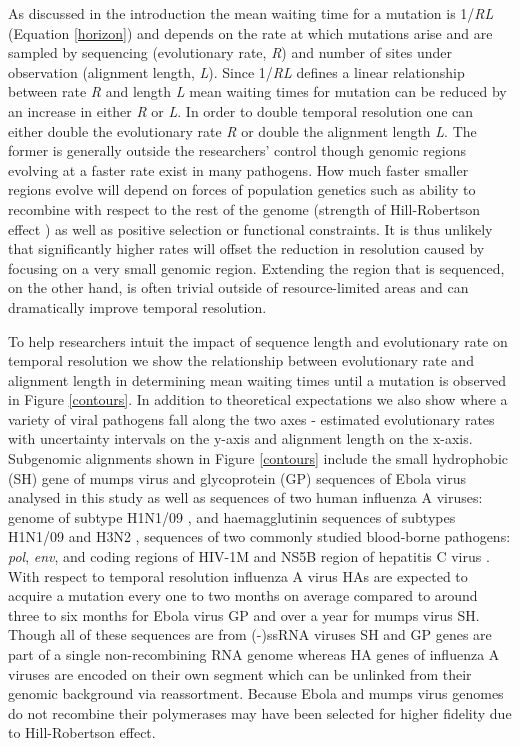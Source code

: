 \documentclass{bmcart}
\begin{document}
As discussed in the introduction the mean waiting time for a mutation is 1/\textit{RL} (Equation \ref{horizon}) and depends on the rate at which mutations arise and are sampled by sequencing (evolutionary rate, \textit{R}) and number of sites under observation (alignment length, \textit{L}).
Since 1/\textit{RL} defines a linear relationship between rate \textit{R} and length \textit{L} mean waiting times for mutation can be reduced by an increase in either \textit{R} or \textit{L}.
In order to double temporal resolution one can either double the evolutionary rate \textit{R} or double the alignment length \textit{L}.
The former is generally outside the researchers' control though genomic regions evolving at a faster rate exist in many pathogens.
How much faster smaller regions evolve will depend on forces of population genetics such as ability to recombine with respect to the rest of the genome (strength of Hill-Robertson effect \cite{hill_effect_1966}) as well as positive selection or functional constraints.
It is thus unlikely that significantly higher rates will offset the reduction in resolution caused by focusing on a very small genomic region.
Extending the region that is sequenced, on the other hand, is often trivial outside of resource-limited areas and can dramatically improve temporal resolution.

To help researchers intuit the impact of sequence length and evolutionary rate on temporal resolution we show the relationship between evolutionary rate and alignment length in determining mean waiting times until a mutation is observed in Figure \ref{contours}.
In addition to theoretical expectations we also show where a variety of viral pathogens fall along the two axes - estimated evolutionary rates with uncertainty intervals on the y-axis and alignment length on the x-axis.
Subgenomic alignments shown in Figure \ref{contours} include the small hydrophobic (SH) gene of mumps virus \cite{cui_evolutionary_2017} and glycoprotein (GP) sequences of Ebola virus analysed in this study as well as sequences of two human influenza A viruses: genome of subtype H1N1/09 \cite{hedge_real-time_2013}, and haemagglutinin sequences of subtypes H1N1/09 \cite{smith_origins_2009} and H3N2 \cite{rambaut_genomic_2008}, sequences of two commonly studied blood-borne pathogens: \textit{pol}, \textit{env}, and coding regions of HIV-1M \cite{patino-galindo_substitution_2017} and NS5B region of hepatitis C virus \cite{magiorkinis_global_2009}.
With respect to temporal resolution influenza A virus HAs are expected to acquire a mutation every one to two months on average compared to around three to six months for Ebola virus GP and over a year for mumps virus SH.
Though all of these sequences are from (-)ssRNA viruses SH and GP genes are part of a single non-recombining RNA genome \cite{chare_phylogenetic_2003} whereas HA genes of influenza A viruses are encoded on their own segment which can be unlinked from their genomic background via reassortment.
Because Ebola and mumps virus genomes do not recombine their polymerases may have been selected for higher fidelity due to Hill-Robertson effect.
\end{document}
